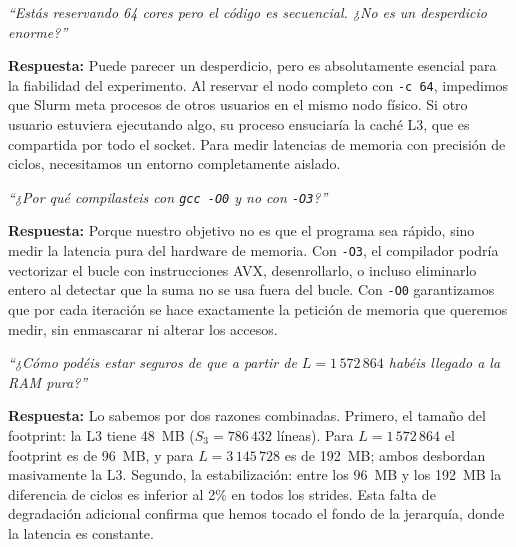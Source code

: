 \documentclass[12pt,a4paper]{article}
\begin{document}
\begin{tcolorbox}[trampa, title={Pregunta Trampa 2 --- \texttt{\#SBATCH -c 64}}]
\textit{``Estás reservando 64 cores pero el código es secuencial. ¿No es un desperdicio enorme?''}

\vspace{6pt}
\textbf{Respuesta:} Puede parecer un desperdicio, pero es absolutamente esencial para la fiabilidad del experimento. Al reservar el nodo completo con \texttt{-c 64}, impedimos que Slurm meta procesos de otros usuarios en el mismo nodo físico. Si otro usuario estuviera ejecutando algo, su proceso ensuciaría la caché L3, que es compartida por todo el socket. Para medir latencias de memoria con precisión de ciclos, necesitamos un entorno completamente aislado.
\end{tcolorbox}

\begin{tcolorbox}[trampa, title={Pregunta Trampa 3 --- \texttt{gcc -O0}}]
\textit{``¿Por qué compilasteis con \texttt{gcc -O0} y no con \texttt{-O3}?''}

\vspace{6pt}
\textbf{Respuesta:} Porque nuestro objetivo no es que el programa sea rápido, sino medir la latencia pura del hardware de memoria. Con \texttt{-O3}, el compilador podría vectorizar el bucle con instrucciones AVX, desenrollarlo, o incluso eliminarlo entero al detectar que la suma no se usa fuera del bucle. Con \texttt{-O0} garantizamos que por cada iteración se hace exactamente la petición de memoria que queremos medir, sin enmascarar ni alterar los accesos.
\end{tcolorbox}

\begin{tcolorbox}[trampa, title={Pregunta Trampa 4 --- ¿Habéis llegado a RAM pura?}]
\textit{``¿Cómo podéis estar seguros de que a partir de $L=1\,572\,864$ habéis llegado a la RAM pura?''}

\vspace{6pt}
\textbf{Respuesta:} Lo sabemos por dos razones combinadas. Primero, el tamaño del footprint: la L3 tiene 48~MB ($S_3=786\,432$ líneas). Para $L=1\,572\,864$ el footprint es de 96~MB, y para $L=3\,145\,728$ es de 192~MB; ambos desbordan masivamente la L3. Segundo, la estabilización: entre los 96~MB y los 192~MB la diferencia de ciclos es inferior al 2\% en todos los strides. Esta falta de degradación adicional confirma que hemos tocado el fondo de la jerarquía, donde la latencia es constante.
\end{tcolorbox}
\end{document}
